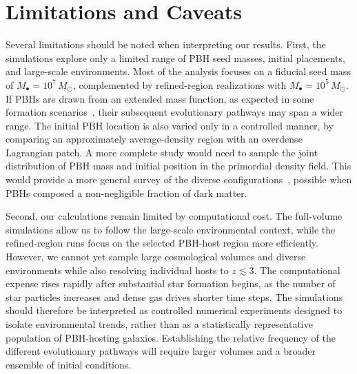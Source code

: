 \documentclass[twocolumn,trackchanges]{aastex701}
\begin{document}
\section{Limitations and Caveats} \label{subsec:Caveat}


Several limitations should be noted when interpreting our results. First, the simulations explore only a limited range of PBH seed masses, initial placements, and large-scale environments. Most of the analysis focuses on a fiducial seed mass of $M_{\bullet}=10^7\,M_\odot$, complemented by refined-region realizations with $M_{\bullet}=10^5\,M_\odot$. If PBHs are drawn from an extended mass function, as expected in some formation scenarios~\citep[e.g.,][]{Carr2021PDU....3100755C}, their subsequent evolutionary pathways may span a wider range. The initial PBH location is also varied only in a controlled manner, by comparing an approximately average-density region with an overdense Lagrangian patch. A more complete study would need to sample the joint distribution of PBH mass and initial position in the primordial density field. This would provide a more general survey of the diverse configurations~\citep[for example triple black holes at high-$z$, see e.g.,][]{TripleBHUbler2026}, possible when PBHs composed a non-negligible fraction of dark matter.


Second, our calculations remain limited by computational cost. The full-volume simulations allow us to follow the large-scale environmental context, while the refined-region runs focus on the selected PBH-host region more efficiently. 
However, we cannot yet sample large cosmological volumes and diverse environments while also resolving individual hosts to $z\lesssim3$. The computational expense rises rapidly after substantial star formation begins, as the number of star particles increases and dense gas drives shorter time steps. The simulations should therefore be interpreted as controlled numerical experiments designed to isolate environmental trends, rather than as a statistically representative population of PBH-hosting galaxies. Establishing the relative frequency of the different evolutionary pathways will require larger volumes and a broader ensemble of initial conditions.
\end{document}
